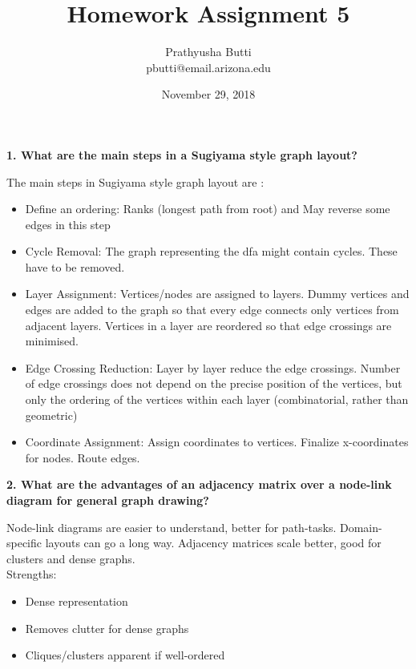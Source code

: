 \documentclass{article}[12pt]
\begin{document}
\title{Homework Assignment 5 \\
	}
\date{November 29, 2018}

\author{
   Prathyusha Butti \\
   pbutti@email.arizona.edu
}

\maketitle

\noindent
{\bf 1. What are the main steps in a Sugiyama style graph layout? }

{

	The main steps in Sugiyama style graph layout are : 


    \begin{itemize}
    	\item Define an ordering: Ranks (longest path from root) and May reverse some edges in this step
		\item Cycle Removal: The graph representing the dfa might contain cycles. These have to be removed.
		\item Layer Assignment: Vertices/nodes are assigned to layers. Dummy vertices and edges are added to the graph so that every edge connects only vertices from adjacent layers. Vertices in a layer are reordered so that edge crossings are minimised.
		\item Edge Crossing Reduction: Layer by layer reduce the edge crossings. Number of edge crossings does not depend on the precise position of the vertices, but only the ordering of the vertices within each layer (combinatorial, rather than geometric)
		\item Coordinate Assignment: Assign coordinates to vertices. Finalize x-coordinates for nodes. Route edges.


	\end{itemize}
}




\vspace{2ex}\noindent
{\bf 2. What are the advantages of an adjacency matrix over a node-link diagram for general graph drawing? }

{
	Node-link diagrams are easier to understand, better for path-tasks. Domain-specific layouts can go a long way.
	Adjacency matrices scale better, good for clusters and dense graphs. \\

	Strengths: 
	\begin{itemize}
	    \item Dense representation
	    \item Removes clutter for dense graphs
	    \item Cliques/clusters apparent if well-ordered
    \end{itemize}
}
\end{document}

